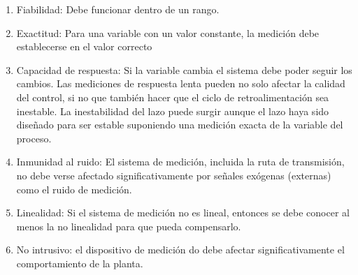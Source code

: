 \documentclass[a4paper]{article}
\begin{document}
\begin{enumerate}
		\item Fiabilidad: Debe funcionar dentro de un rango.
		\item Exactitud: Para una variable con un valor constante, la medición debe establecerse en el valor correcto
		\item Capacidad de respuesta: Si la variable cambia el sistema debe poder seguir los cambios. Las mediciones de respuesta lenta pueden no solo afectar la calidad del control, si no que también hacer que el ciclo de retroalimentación sea inestable. La inestabilidad del lazo puede surgir aunque el lazo haya sido diseñado para ser estable suponiendo una medición exacta de la variable del proceso.
		\item Inmunidad al ruido: El sistema de medición, incluida la ruta de transmisión, no debe verse afectado significativamente por señales exógenas (externas) como el ruido de medición.
		\item Linealidad: Si el sistema de medición no es lineal, entonces se debe conocer al menos la no linealidad para que pueda compensarlo.
		\item No intrusivo: el dispositivo de medición do debe afectar significativamente el comportamiento de la planta.
\end{enumerate}
\end{document}
